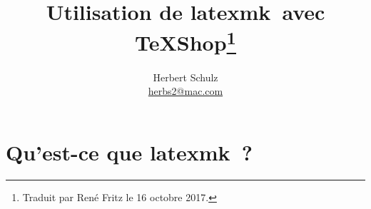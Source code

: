 \documentclass[11pt,french]{article}
\newcommand{\TS}{\textsf{\TeX Shop}}
\newcommand{\latexmk}{\textsf{latexmk}}
\newcommand{\cmd}[1]{\textsf{#1}}
\begin{document}
\title{Utilisation de \latexmk\ avec \TS\thanks{Traduit par René Fritz le 16 octobre 2017.}}
\author{Herbert Schulz\\\small\href{mailto:herbs2@mac.com}{herbs2@mac.com}}
\date{}


\maketitle
\thispagestyle{empty}

\section{Qu'est-ce que \latexmk\ ?}

\end{document}
